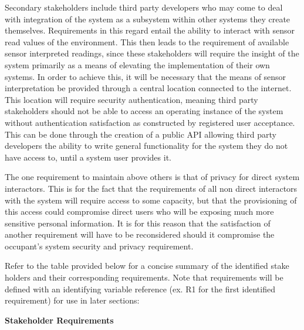\documentclass{article}
\begin{document}
Secondary stakeholders include third party developers who may come to deal with integration of the system as a subsystem within other systems they create themselves. Requirements in this regard entail the ability to interact with sensor read values of the environment. This then leads to the requirement of available sensor interpreted readings, since these stakeholders will require the insight of the system primarily as a means of elevating the implementation of their own systems. In order to achieve this, it will be necessary that the means of sensor interpretation be provided through a central location connected to the internet. This location will require security authentication, meaning third party stakeholders should not be able to access an operating instance of the system without authentication satisfaction as constructed by registered user acceptance. This can be done through the creation of a public \gls{API} allowing third party developers the ability to write general functionality for the system they do not have access to, until a system user provides it.  

The one requirement to maintain above others is that of privacy for direct system interactors. This is for the fact that the requirements of all non direct interactors with the system will require access to some capacity, but that the provisioning of this access could compromise direct users who will be exposing much more sensitive personal information. It is for this reason that the satisfaction of another requirement will have to be reconsidered should it compromise the occupant's system security and privacy requirement.  

Refer to the table provided below for a concise summary of the identified stake holders and their corresponding requirements. Note that requirements will be defined with an identifying variable reference (ex. R1 for the first identified requirement) for use in later sections:
\pagebreak

\begin{flushleft}
\large
{}
\textbf{Stakeholder Requirements}
\end{flushleft}
\end{document}
